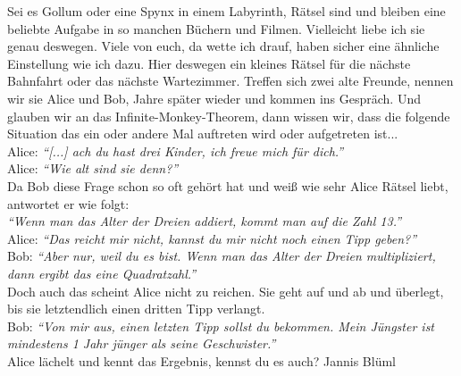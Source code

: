 {Sei es Gollum oder eine Spynx in einem Labyrinth, Rätsel sind und bleiben eine beliebte Aufgabe in so manchen Büchern und Filmen. Vielleicht liebe ich sie genau deswegen. Viele von euch, da wette ich drauf, haben sicher eine ähnliche Einstellung wie ich dazu. Hier deswegen ein kleines Rätsel für die nächste Bahnfahrt oder das nächste Wartezimmer.}
{
Treffen sich zwei alte Freunde, nennen wir sie Alice und Bob, Jahre später wieder und kommen ins Gespräch.
Und glauben wir an das Infinite-Monkey-Theorem, dann wissen wir, dass die folgende Situation das ein oder andere Mal auftreten wird oder aufgetreten ist... \\

Alice: \textit{\enquote{[...] ach du hast drei Kinder, ich freue mich für
        dich.}} \\

Alice: \textit{\enquote{Wie alt sind sie denn?}} \\

Da Bob diese Frage schon so oft gehört hat und weiß wie sehr Alice Rätsel
liebt, antwortet er wie folgt: \\

\textit{\enquote{Wenn man das Alter der Dreien addiert, kommt man auf die Zahl
        13.}} \\

Alice: \textit{\enquote{Das reicht mir nicht, kannst du mir nicht noch einen
        Tipp geben?}} \\

Bob: \textit{\enquote{Aber nur, weil du es bist. Wenn man das Alter der Dreien
        multipliziert, dann ergibt das eine Quadratzahl.}} \\

Doch auch das scheint Alice nicht zu reichen. Sie geht auf und ab und überlegt, bis sie letztendlich einen dritten Tipp verlangt. \\

Bob: \textit{\enquote{Von mir aus, einen letzten Tipp sollst du bekommen. Mein
        Jüngster ist mindestens 1 Jahr jünger als seine Geschwister.}} \\

Alice lächelt und kennt das Ergebnis, kennst du es auch?
}{Jannis Blüml}
